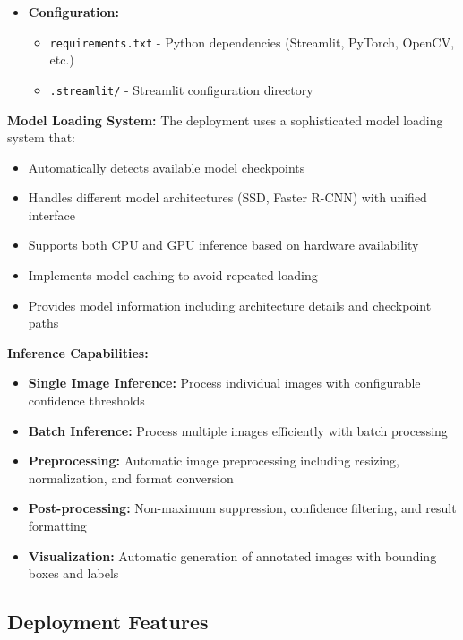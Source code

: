 \documentclass[12pt,a4paper]{article}
\begin{document}
\begin{itemize}
\begin{itemize}
        \item \texttt{run.bat} - Windows batch script for easy startup
        \item \texttt{Dockerfile} - Container deployment configuration
    \end{itemize}
    \item \textbf{Configuration:}
    \begin{itemize}
        \item \texttt{requirements.txt} - Python dependencies (Streamlit, PyTorch, OpenCV, etc.)
        \item \texttt{.streamlit/} - Streamlit configuration directory
    \end{itemize}
\end{itemize}

\textbf{Model Loading System:}
The deployment uses a sophisticated model loading system that:
\begin{itemize}
    \item Automatically detects available model checkpoints
    \item Handles different model architectures (SSD, Faster R-CNN) with unified interface
    \item Supports both CPU and GPU inference based on hardware availability
    \item Implements model caching to avoid repeated loading
    \item Provides model information including architecture details and checkpoint paths
\end{itemize}

\textbf{Inference Capabilities:}
\begin{itemize}
    \item \textbf{Single Image Inference:} Process individual images with configurable confidence thresholds
    \item \textbf{Batch Inference:} Process multiple images efficiently with batch processing
    \item \textbf{Preprocessing:} Automatic image preprocessing including resizing, normalization, and format conversion
    \item \textbf{Post-processing:} Non-maximum suppression, confidence filtering, and result formatting
    \item \textbf{Visualization:} Automatic generation of annotated images with bounding boxes and labels
\end{itemize}

\subsection{Deployment Features}
\end{document}
